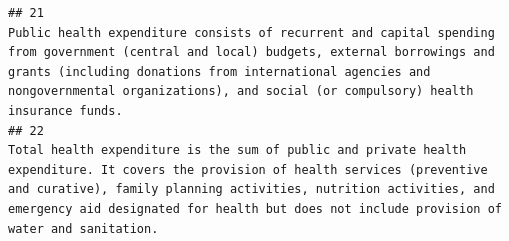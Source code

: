 \documentclass[
]{article}
\begin{document}
\begin{verbatim}
## 21                                                                                                                                                                                                                                                                                                                                                                                                                                                                                                                                                                                                                                                                                                                                                                                                                                                                                                                                                                                                                                                                                                                                                          Public health expenditure consists of recurrent and capital spending from government (central and local) budgets, external borrowings and grants (including donations from international agencies and nongovernmental organizations), and social (or compulsory) health insurance funds.
## 22                                                                                                                                                                                                                                                                                                                                                                                                                                                                                                                                                                                                                                                                                                                                                                                                                                                                                                                                                                                                                                                                                                                                             Total health expenditure is the sum of public and private health expenditure. It covers the provision of health services (preventive and curative), family planning activities, nutrition activities, and emergency aid designated for health but does not include provision of water and sanitation.

\end{verbatim}
\end{document}
